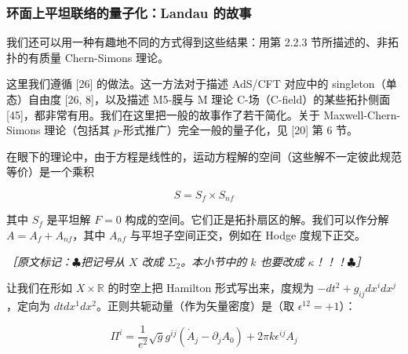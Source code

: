 \subsubsection{环面上平坦联络的量子化：Landau 的故事} %

我们还可以用一种有趣地不同的方式得到这些结果：用第 2.2.3 节所描述的、非拓扑的有质量 Chern-Simons 理论。

这里我们遵循 [26] 的做法。这一方法对于描述 AdS/CFT 对应中的 singleton（单态）自由度 [26, 8]，以及描述 M5-膜与 M 理论 C-场（C-field）的某些拓扑侧面 [45]，都非常有用。我们在这里把一般的故事作了若干简化。关于 Maxwell-Chern-Simons 理论（包括其 $p$-形式推广）完全一般的量子化，见 [20] 第 6 节。

在眼下的理论中，由于方程是线性的，运动方程解的空间（这些解不一定彼此规范等价）是一个乘积

\begin{equation}
  S=S_f\times S_{nf}
  \tag{2.182}
  \label{eq:2.182}
\end{equation}

其中 $S_f$ 是平坦解 $F=0$ 构成的空间。它们正是拓扑扇区的解。我们可以作分解 $A=A_f+A_{nf}$，其中 $A_{nf}$ 与平坦子空间正交，例如在 Hodge 度规下正交。

{\small\itshape ［原文标记：$\clubsuit$把记号从 $X$ 改成 $\Sigma_2$。本小节中的 $k$ 也要改成 $\kappa$！！！$\clubsuit$］}

让我们在形如 $X\times\mathbb{R}$ 的时空上把 Hamilton 形式写出来，度规为 $-dt^2+g_{ij}dx^idx^j$，定向为 $dtdx^1dx^2$。正则共轭动量（作为矢量密度）是（取 $\epsilon^{12}=+1$）：

\begin{equation}
  \Pi^i=\frac{1}{e^2}\sqrt{g}g^{ij}(\dot A_j-\partial_jA_0)+2\pi k\epsilon^{ij}A_j
  \tag{2.183}
  \label{eq:2.183}
\end{equation}

